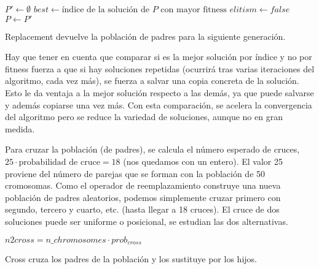 \documentclass{article}
\begin{document}
\begin{algorithm}[H]
	\DontPrintSemicolon %
	$P'\gets\emptyset$\;
	$best\gets\text{índice de la solución de $P$ con mayor fitness}$\;
	$elitism\gets false$ 
	$P\gets P'$\;
	\caption{{\sc Replacement} devuelve la población de padres para la siguiente generación.}
	\label{alg:replacement}
\end{algorithm}

Hay que tener en cuenta que comparar si es la mejor solución por índice y no por fitness fuerza a que si hay soluciones repetidas
(ocurrirá tras varias iteraciones del algoritmo, cada vez más), se fuerza a salvar una copia concreta de la solución. Esto le da ventaja
a la mejor solución respecto a las demás, ya que puede salvarse y además copiarse una vez más.
Con esta comparación, se acelera la convergencia del algoritmo pero se reduce la variedad de soluciones, aunque
no en gran medida.

Para cruzar la población (de padres), se calcula el número esperado de cruces, $25\cdot\text{probabilidad de cruce}=18$ (nos quedamos
con un entero). El valor 25 proviene del número de parejas que se forman con la población de 50 cromosomas. Como el operador de
reemplazamiento construye una nueva población de padres aleatorios, podemos simplemente cruzar primero con segundo, tercero y cuarto, etc. (hasta llegar a 18 cruces).
El cruce de dos soluciones puede ser uniforme o posicional, se estudian las dos alternativas.

\begin{algorithm}[H]
	\DontPrintSemicolon %
	$n2cross=n\_chromosomes\cdot prob_{cross}$ 
	\caption{{\sc Cross} cruza los padres de la población y los sustituye por los hijos.}
	\label{alg:cross-generational}
\end{algorithm}
\end{document}
